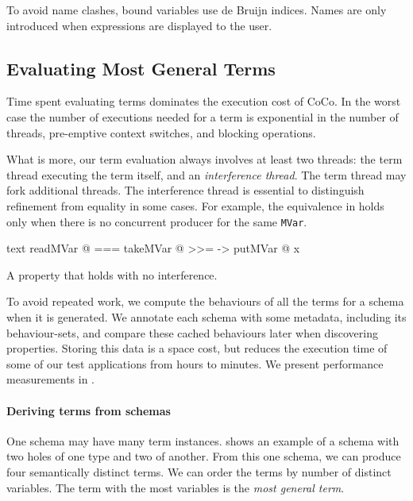 To avoid name clashes, bound variables use de Bruijn
indices\cite{debruijn1972}.  Names are only introduced when
expressions are displayed to the user.

\subsection{Evaluating Most General Terms}
\label{sec:coco-hiw-eval}

Time spent evaluating terms dominates the execution cost of CoCo.  In
the worst case the number of executions needed for a term is
exponential in the number of threads, pre-emptive context switches,
and blocking operations\cite{musuvathi2007}.

What is more, our term evaluation always involves at least two
threads: the term thread executing the term itself, and an
\emph{interference thread}.  The term thread may fork additional
threads.  The interference thread is essential to distinguish
refinement from equality in some cases.  For example, the equivalence
in  holds only when there is no concurrent
producer for the same \verb|MVar|.

\begin{listing}
\centering
\begin{cminted}{text}
readMVar @  ===  takeMVar @ >>= \x -> putMVar @ x
\end{cminted}
\caption{A property that holds with no interference.}\label{lst:prop_mvar3}
\end{listing}

To avoid repeated work, we compute the behaviours of all the terms for
a schema when it is generated.  We annotate each schema with some
metadata, including its behaviour-sets, and compare these cached
behaviours later when discovering properties.  Storing this data is a
space cost, but reduces the execution time of some of our test
applications from hours to minutes.  We present performance
measurements in .

\paragraph{Deriving terms from schemas}
One schema may have many term instances.   shows
an example of a schema with two holes of one type and two of another.
From this one schema, we can produce four semantically distinct terms.
We can order the terms by number of distinct variables.  The term with
the most variables is the \emph{most general term}.

